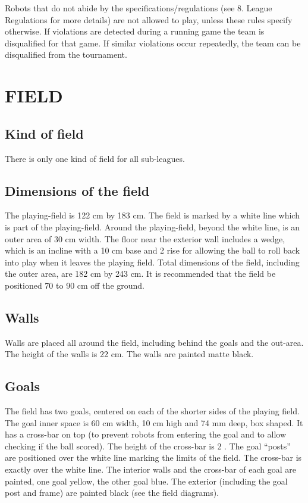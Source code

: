 \documentclass{article}
\begin{document}
Robots that do not abide by the specifications/regulations (see 8. League
Regulations for more details) are not allowed to play, unless these rules
specify otherwise. If violations are detected during a running game the team is
disqualified for that game. If similar violations occur repeatedly, the team
can be disqualified from the tournament.

\section{FIELD \label{ref-028}}

\subsection{Kind of field \label{ref-029}}

There is only one kind of field for all sub-leagues.

\subsection{ Dimensions of the field \label{ref-030}}

The playing-field is 122 cm by 183 cm. The field is marked by a white line
which is part of the playing-field. Around the playing-field, beyond the white
line, is an outer area of 30 cm width. The floor near the exterior wall
includes a wedge, which is an incline with a 10 cm base and
2 \added[id=TC]{$\pm$ 1 cm} rise for allowing the ball to roll back into play
when it leaves the playing field.  Total dimensions of the field, including the
outer area, are 182 cm by 243 cm.  It is recommended that the field be
positioned 70 to 90 cm off the ground.

\subsection{ Walls \label{ref-walls}}

Walls are placed all around the field, including behind the goals and the
out-area. The height of the walls is 22 cm. The walls are painted matte black.


\subsection{ Goals \label{ref-032}}

The field has two goals, centered on each of the shorter sides of the playing
field. The goal inner space is 60 cm width, 10 cm high and 74 mm deep, box
shaped. It has a cross-bar on top (to prevent robots from entering the goal and
to allow checking if the ball scored). The height of the cross-bar is 2
\added[id=TC]{$\pm$ 1 cm}. The goal ``posts'' are positioned over the white
line marking the limits of the field. The cross-bar is exactly over the white
line. The interior walls and the cross-bar of each goal are painted, one goal
yellow, the other goal blue. The exterior (including the goal post and frame)
are painted black (see the field diagrams).
\end{document}
